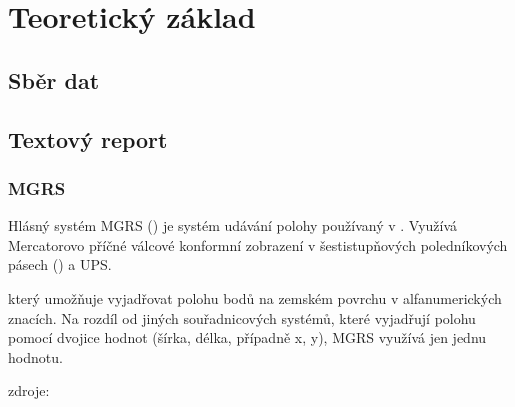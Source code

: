 \chapter{Teoretický základ}
\label{2-teorie}

\section{Sběr dat}


\section{Textový report}


\subsection{MGRS}
Hlásný systém MGRS () je systém udávání polohy používaný v . Využívá Mercatorovo příčné válcové konformní zobrazení v šestistupňových poledníkových pásech () a UPS. 


který umožňuje vyjadřovat polohu bodů na zemském povrchu v alfanumerických znacích. 
Na rozdíl od jiných souřadnicových systémů, které vyjadřují polohu pomocí dvojice hodnot (šírka, délka, případně x, y), MGRS využívá jen jednu hodnotu.


zdroje: 
